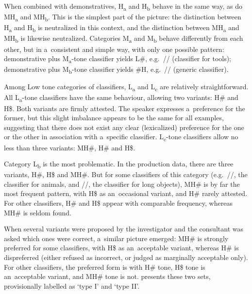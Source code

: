 When combined with demonstratives, H\textsubscript{a} and H\textsubscript{b} behave in the same way, as do MH\textsubscript{a} and MH\textsubscript{b}. This is the
simplest part of the picture: the distinction between H\textsubscript{a} and H\textsubscript{b} is neutralized in this context, and
the distinction between MH\textsubscript{a} and MH\textsubscript{b} is likewise neutralized. Categories M\textsubscript{a} and M\textsubscript{b} behave differently
from each other, but in a~consistent and simple way, with only one possible pattern:
demonstrative plus M\textsubscript{a}-tone classifier yields L\#, e.g.~// (classifier for tools);
demonstrative plus M\textsubscript{b}-tone classifier yields \#H, e.g.~// (generic classifier).

Among Low tone categories of classifiers, L\textsubscript{a} and L\textsubscript{c} are relatively straightforward. All L\textsubscript{a}-tone
classifiers have the same behaviour, allowing two variants: H\# and H\$. Both variants are firmly
attested. The speaker expresses a~preference for the former, but this slight imbalance appears to be
the same for all examples, suggesting that there does not exist any clear (lexicalized) preference
for the one or the other in association with a~specific classifier. L\textsubscript{c}-tone
classifiers allow no less than three variants: MH\#, H\# and H\$.

Category L\textsubscript{b} is the most problematic. In the production data, there are three variants, H\#, H\$ and
MH\#. But for some classifiers of this category (e.g.~//, the classifier for animals, and
//, the classifier for long objects), MH\# is by far the most frequent pattern, with H\$
as an~occasional {variant}, and H\# rarely attested. For other classifiers, H\# and H\$ appear
with comparable frequency, whereas MH\# is seldom found.

When several variants were proposed by the investigator and the consultant was
asked which ones were correct, a~similar picture emerged: MH\# is strongly preferred for some classifiers, with H\$ as
an~acceptable {variant}, whereas H\# is dispreferred (either refused as incorrect, or judged as marginally acceptable only). For other classifiers, the preferred form is with H\# tone, H\$ tone is
an~acceptable {variant}, and MH\# tone is not.  presents these two sets, provisionally labelled
as ‘type I’ and ‘type II’.

